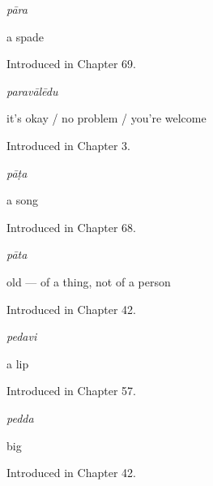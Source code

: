 \noindent\begin{minipage}[t]{\linewidth}
\raggedright
\textbf{}\enspace\emph{pāra}\par
\small a spade\par
\footnotesize Introduced in Chapter 69.
\end{minipage}\par\medskip

\noindent\begin{minipage}[t]{\linewidth}
\raggedright
\textbf{}\enspace\emph{paravālēdu}\par
\small it's okay / no problem / you're welcome\par
\footnotesize Introduced in Chapter 3.
\end{minipage}\par\medskip

\noindent\begin{minipage}[t]{\linewidth}
\raggedright
\textbf{}\enspace\emph{pāṭa}\par
\small a song\par
\footnotesize Introduced in Chapter 68.
\end{minipage}\par\medskip

\noindent\begin{minipage}[t]{\linewidth}
\raggedright
\textbf{}\enspace\emph{pāta}\par
\small old — of a thing, not of a person\par
\footnotesize Introduced in Chapter 42.
\end{minipage}\par\medskip

\noindent\begin{minipage}[t]{\linewidth}
\raggedright
\textbf{}\enspace\emph{pedavi}\par
\small a lip\par
\footnotesize Introduced in Chapter 57.
\end{minipage}\par\medskip

\noindent\begin{minipage}[t]{\linewidth}
\raggedright
\textbf{}\enspace\emph{pedda}\par
\small big\par
\footnotesize Introduced in Chapter 42.
\end{minipage}\par\medskip

